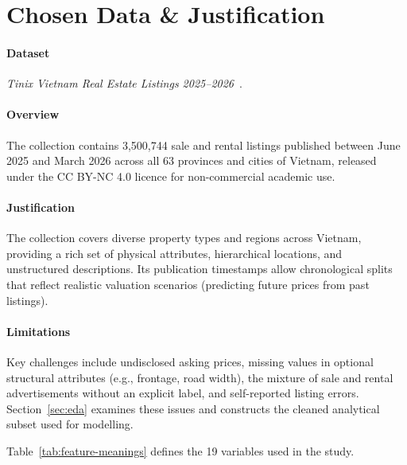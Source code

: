 \section{Chosen Data \& Justification}
\label{sec:chosen-data}

\paragraph{Dataset}
\textit{Tinix Vietnam Real Estate Listings 2025--2026}~\cite{tinix_vietnam_real_estate_2026}.

\paragraph{Overview}
The collection contains 3{,}500{,}744 sale and rental listings published between June 2025 and March 2026 across all 63 provinces and cities of Vietnam, released under the CC BY-NC 4.0 licence for non-commercial academic use.

\paragraph{Justification}
The collection covers diverse property types and regions across Vietnam, providing a rich set of physical attributes, hierarchical locations, and unstructured descriptions. Its publication timestamps allow chronological splits that reflect realistic valuation scenarios (predicting future prices from past listings).

\paragraph{Limitations}
Key challenges include undisclosed asking prices, missing values in optional structural attributes (e.g., frontage, road width), the mixture of sale and rental advertisements without an explicit label, and self-reported listing errors. Section~\ref{sec:eda} examines these issues and constructs the cleaned analytical subset used for modelling.

Table~\ref{tab:feature-meanings} defines the 19 variables used in the study.

